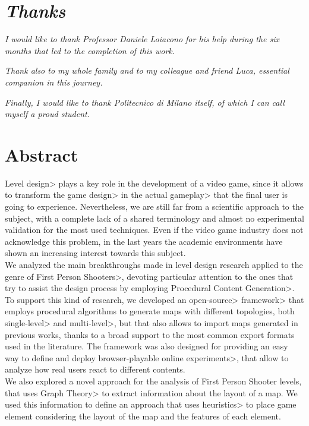 \chapter{\textit{Thanks}}

\textit{I would like to thank Professor Daniele Loiacono for his help during the six months that led to the completion of this work.}

\par \mbox{}

\textit{Thank also to my whole family and to my colleague and friend Luca, essential companion in this journey.}

\par \mbox{}

\textit{Finally, I would like to thank Politecnico di Milano itself, of which I can call myself a proud student.}

\par \mbox{}

\textit{}

\chapter{Abstract}

\<Level design> plays a key role in the development of a video game, since it allows to transform the \<game design> in the actual \<gameplay> that the final user is going to experience. Nevertheless, we are still far from a scientific approach to the subject, with a complete lack of a shared terminology and almost no experimental validation for the most used techniques. Even if the video game industry does not acknowledge this problem, in the last years the academic environments have shown an increasing interest towards this subject. \\
We analyzed the main breakthroughs made in level design research applied to the genre of \<First Person Shooters>, devoting particular attention to the ones that try to assist the design process by employing \<Procedural Content Generation>. To support this kind of research, we developed an \<open-source> \<framework> that employs procedural algorithms to generate maps with different topologies, both \<single-level> and \<multi-level>, but that also allows to import maps generated in previous works, thanks to a broad support to the most common export formats used in the literature. The framework was also designed for providing an easy way to define and deploy \<browser-playable online experiments>, that allow to analyze how real users react to different contents. \\
We also explored a novel approach for the analysis of First Person Shooter levels, that uses \<Graph Theory> to extract information about the layout of a map. We used this information to define an approach that uses \<heuristics> to place game element considering the layout of the map and the features of each element.

